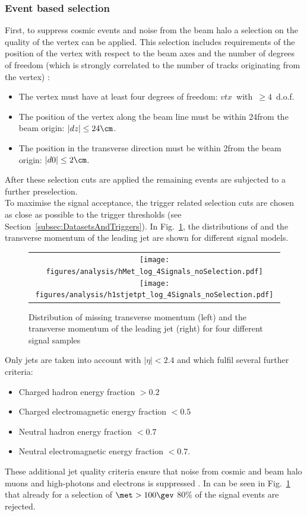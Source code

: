 \subsubsection*{Event based selection}
First, to suppress cosmic events and noise from the beam halo a selection on the quality of the vertex can be applied.
This selection includes requirements of the position of the vertex with respect to the beam axes and the number of degrees of freedom (which is strongly correlated to the number of tracks originating from the vertex) \cite{bib:CMS:Tracking_7TeV_PAS}:  
\begin{itemize}
\renewcommand{\labelitemi}{\footnotesize{\ding{118}}}
\item The vertex must have at least four degrees of freedom: \mbox{$vtx$ with $\geq 4$ d.o.f.}
\item The position of the vertex along the beam line must be within 24\cm from the beam origin: \mbox{$|dz| \leq 24\cm$.}
\item The position in the transverse direction must be within 2\cm from the beam origin: \mbox{$|d0| \leq 2\cm$.}
\end{itemize}
After these selection cuts are applied the remaining events are subjected to a further preselection.\\

To maximise the signal acceptance, the trigger related selection cuts are chosen as close as possible to the trigger thresholds (see Section~\ref{subsec:DatasetsAndTriggers}).
In Fig.~\ref{fig:SignalMET+SignalJetPt}, the distributions of \met and the transverse momentum of the leading jet \ptfirstjet are shown for different signal models.
\begin{figure}[!b]
  \centering 
  \begin{tabular}{c}
    \texttt{[image: figures/analysis/hMet\_log\_4Signals\_noSelection.pdf]}
    \texttt{[image: figures/analysis/h1stjetpt\_log\_4Signals\_noSelection.pdf]}
  \end{tabular}
  \caption{Distribution of missing transverse momentum (left) and the transverse momentum of the leading jet (right) for four different signal samples}
  \label{fig:SignalMET+SignalJetPt}
\end{figure}
Only jets are taken into account with $|\eta|<2.4$ and which fulfil several further criteria:
\begin{itemize}
\item Charged hadron energy fraction $>0.2$
\item Charged electromagnetic energy fraction $<0.5$
\item Neutral hadron energy fraction $<0.7$
\item Neutral electromagnetic energy fraction $<0.7$.
\end{itemize}
These additional jet quality criteria ensure that noise from cosmic and beam halo muons and high-\pt photons and electrons is suppressed \cite{bib:CMS:DM_8TeV_AN}.
In can be seen in Fig.~\ref{fig:SignalMET+SignalJetPt} that already for a selection of $\met>100\gev$ 80\% of the signal events are rejected.

